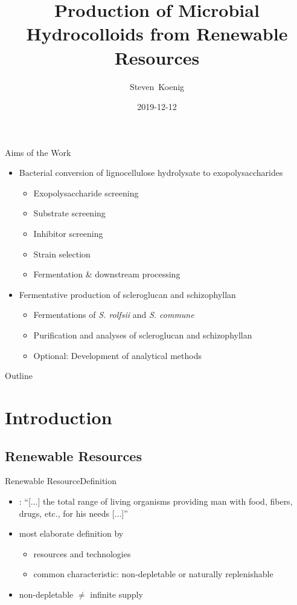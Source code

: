 \documentclass[mathserif]{beamer}
\title[\EPS{}s from \LCH{}] %
{Production of Microbial Hydrocolloids from Renewable Resources}
\author{Steven~Koenig}
\institute[TUM-CS, CBR] %
{Chair of Chemistry of Biogenic Resources\\
Technische Universität München}
\date[] %
{2019-12-12}
\newcommand{\mo}[1]{\emph{#1}} %
\newcommand{\rolf}{\mo{S. rolfsii}}
\newcommand{\comm}{\mo{S. commune}}
\newcommand{\lch}{lignocellulose hydrolysate}
\newcommand{\EPS}{Exopolysaccharide}
\newcommand{\eps}{exopolysaccharide}
\newcommand{\scl}{scleroglucan}
\newcommand{\shz}{schizophyllan}
\begin{document}
\titlefontii
\begin{frame}
  \titlepage
\end{frame}

\begin{frame}{Aims of the Work}{}
	\begin{itemize}
		\item Bacterial conversion of \lch{} to \eps{}s %
		\pause
		\begin{itemize}
			\item \EPS{} screening
			\item Substrate screening
			\item Inhibitor screening
			\pause
			\item Strain selection
			\item Fermentation \& downstream processing
		\end{itemize}
		\pause
		\item Fermentative production of \scl{} and \shz{}
		\pause
		\begin{itemize}
			\item Fermentations of \rolf{} and \comm{}
			\item Purification and analyses of \scl{} and \shz{}
			\pause
			\item Optional: Development of analytical methods
		\end{itemize}
	\end{itemize}
\end{frame}

\begin{frame}{Outline}
  \tableofcontents[pausesections]
\end{frame}

\section{Introduction}

\subsection{Renewable Resources}

\begin{frame}{Renewable Resource}{Definition}
	\begin{itemize}
		\item \textcite{Weiss1962}: \enquote{[...] the total range of living organisms providing man with food, fibers, drugs, etc., for his needs [...]}
		\pause
		\item most elaborate definition by \textcite{Armstrong1999}
		\pause
			\begin{itemize}
				\item resources and technologies
				\item common characteristic: non-depletable or naturally replenishable
			\end{itemize}
		\pause
		\item non-depletable $\neq$ infinite supply
	\end{itemize}
\end{frame}
\end{document}

